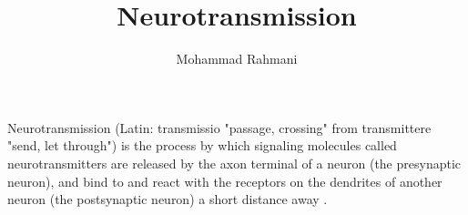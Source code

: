 \documentclass[a4paper]{article}
\title{Neurotransmission}
\date{}
\author{Mohammad Rahmani}
\begin{document}
    \maketitle
    Neurotransmission (Latin: transmissio "passage, crossing" from transmittere "send, let through") is the process by which signaling molecules called neurotransmitters are released by the axon terminal of a neuron (the presynaptic neuron), and bind to and react with the receptors on the dendrites of another neuron (the postsynaptic neuron) a short distance away .
    
    
\end{document}
